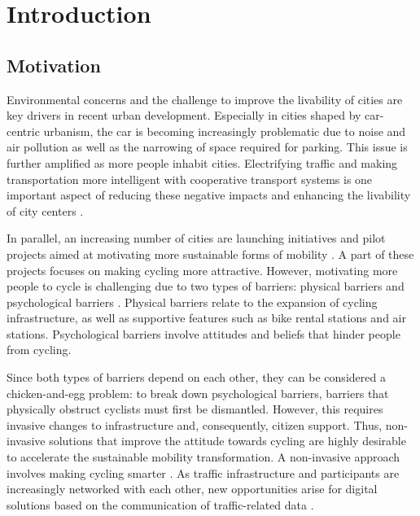 \chapter{Introduction}\label{ch:introduction}

\section{Motivation}

Environmental concerns and the challenge to improve the livability of cities are key drivers in recent urban development. Especially in cities shaped by car-centric urbanism, the car is becoming increasingly problematic due to noise and air pollution as well as the narrowing of space required for parking. This issue is further amplified as more people inhabit cities. Electrifying traffic and making transportation more intelligent with cooperative transport systems is one important aspect of reducing these negative impacts and enhancing the livability of city centers \cite{seredynski_pathways_2023}. 

In parallel, an increasing number of cities are launching initiatives and pilot projects aimed at motivating more sustainable forms of mobility \cite{nieuwenhuijsen_car_2016}. A part of these projects focuses on making cycling more attractive. However, motivating more people to cycle is challenging due to two types of barriers: physical barriers and psychological barriers \cite{nieuwenhuijsen_implementing_2019}. Physical barriers relate to the expansion of cycling infrastructure, as well as supportive features such as bike rental stations and air stations. Psychological barriers involve attitudes and beliefs that hinder people from cycling. 

Since both types of barriers depend on each other, they can be considered a chicken-and-egg problem: to break down psychological barriers, barriers that physically obstruct cyclists must first be dismantled. However, this requires invasive changes to infrastructure and, consequently, citizen support. Thus, non-invasive solutions that improve the attitude towards cycling are highly desirable to accelerate the sustainable mobility transformation. A non-invasive approach involves making cycling smarter \cite{nikolaeva_smart_2019}. As traffic infrastructure and participants are increasingly networked with each other, new opportunities arise for digital solutions based on the communication of traffic-related data \cite{tran_factors_2023}.

